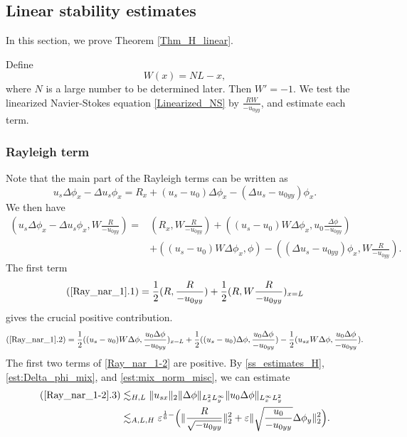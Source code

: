 \documentclass[reqno, 11pt]{amsart}
\theoremstyle{plain}
\theoremstyle{definition}
\theoremstyle{remark}
\numberwithin{equation}{section}
\begin{document}
\subsection{Linear stability estimates}\label{sec:H_linear}

In this section, we prove Theorem \ref{Thm_H_linear}. 

Define
\begin{equation}\label{weight}
W(x) = NL - x,
\end{equation}
where $N$ is a large number to be determined later. Then $W' = -1$. We test the linearized Navier-Stokes equation \eqref{Linearized_NS} by $\frac{RW}{-u_{0yy}}$, and estimate each term.

\subsubsection{Rayleigh term}
Note that the main part of the Rayleigh terms can be written as
$$u_s \Delta \phi_x - \Delta u_s \phi_x = R_x + (u_s-u_0)\Delta \phi_x - (\Delta u_s - u_{0yy})\phi_x.$$
We then have
\begin{equation}\label{Ray_nar_1}
\begin{aligned}
(u_s \Delta \phi_x - \Delta u_s \phi_x , W \frac{R}{-u_{0yy}})=& (R_x,  W \frac{R}{-u_{0yy}}) + ((u_s-u_0)W\Delta\phi_{x},u_0\frac{\Delta\phi}{ -u_{0yy}})\\
&+((u_s-u_0)W\Delta\phi_{x},\phi) - ((\Delta u_s - u_{0yy})\phi_x,W \frac{R}{-u_{0yy}} ).
\end{aligned}
\end{equation}
The first term
\begin{equation}\label{Ray_nar_1-1}
(\ref{Ray_nar_1}.1) = \frac{1}{2}(R, \frac{R}{-u_{0yy}}) + \frac{1}{2}(R,W\frac{R}{-u_{0yy}})_{x=L}
\end{equation}
gives the crucial positive contribution.
\begin{equation}\label{Ray_nar_1-2}
(\ref{Ray_nar_1}.2) = \frac{1}{2}((u_s-u_0)W\Delta\phi,\frac{u_0\Delta\phi}{-u_{0yy}})_{x=L}+\frac{1}{2}((u_s-u_0)\Delta
\phi,\frac{u_0\Delta\phi}{-u_{0yy}}) - \frac{1}{2} (u_{sx} W\Delta
\phi,\frac{u_0\Delta\phi}{-u_{0yy}}).
\end{equation}
The first two terms of \eqref{Ray_nar_1-2} are positive. By \eqref{ss_estimates_H}, \eqref{est:Delta_phi_mix}, and \eqref{est:mix_norm_misc}, we can estimate
\begin{equation}\label{Ray_nar_1-2-1}
\begin{aligned}
(\ref{Ray_nar_1-2}.3) &\lesssim_{H,L} \| u_{sx}\|_2 \| \Delta \phi\|_{L^2_x L^\infty_y} \| u_0 \Delta \phi\|_{L^\infty_x L^2_y}\\
&\lesssim_{A,L,H} \varepsilon^{\frac{1}{6}-} \Big(  \|\frac{R}{\sqrt{-u_{0yy}}}\|_2^2 + \varepsilon \| \sqrt{\frac{u_0}{-u_{0yy}}} \Delta \phi_y\|_2^2 \Big).
\end{aligned}
\end{equation}
\end{document}
